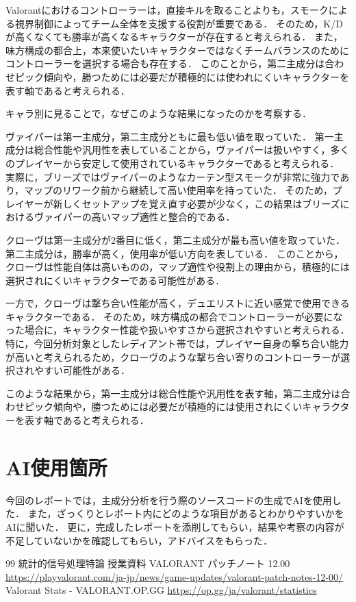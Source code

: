 \documentclass[titlepage,a4paper]{jsarticle}
\begin{document}
Valorantにおけるコントローラーは，直接キルを取ることよりも，スモークによる視界制御によってチーム全体を支援する役割が重要である．
そのため，K/Dが高くなくても勝率が高くなるキャラクターが存在すると考えられる．
また，味方構成の都合上，本来使いたいキャラクターではなくチームバランスのためにコントローラーを選択する場合も存在する．
このことから，第二主成分は合わせピック傾向や，勝つためには必要だが積極的には使われにくいキャラクターを表す軸であると考えられる．

キャラ別に見ることで，なぜこのような結果になったのかを考察する．

ヴァイパーは第一主成分，第二主成分ともに最も低い値を取っていた．
第一主成分は総合性能や汎用性を表していることから，ヴァイパーは扱いやすく，多くのプレイヤーから安定して使用されているキャラクターであると考えられる．
実際に，ブリーズではヴァイパーのようなカーテン型スモークが非常に強力であり，マップのリワーク前から継続して高い使用率を持っていた．
そのため，プレイヤーが新しくセットアップを覚え直す必要が少なく，この結果はブリーズにおけるヴァイパーの高いマップ適性と整合的である．

クローヴは第一主成分が2番目に低く，第二主成分が最も高い値を取っていた．
第二主成分は，勝率が高く，使用率が低い方向を表している．
このことから，クローヴは性能自体は高いものの，マップ適性や役割上の理由から，積極的には選択されにくいキャラクターである可能性がある．

一方で，クローヴは撃ち合い性能が高く，デュエリストに近い感覚で使用できるキャラクターである．
そのため，味方構成の都合でコントローラーが必要になった場合に，キャラクター性能や扱いやすさから選択されやすいと考えられる．
特に，今回分析対象としたレディアント帯では，プレイヤー自身の撃ち合い能力が高いと考えられるため，クローヴのような撃ち合い寄りのコントローラーが選択されやすい可能性がある．

このような結果から，第一主成分は総合性能や汎用性を表す軸，第二主成分は合わせピック傾向や，勝つためには必要だが積極的には使用されにくいキャラクターを表す軸であると考えられる．

\section{AI使用箇所}
  今回のレポートでは，主成分分析を行う際のソースコードの生成でAIを使用した．
  また，ざっくりとレポート内にどのような項目があるとわかりやすいかをAIに聞いた．
  更に，完成したレポートを添削してもらい，結果や考察の内容が不足していないかを確認してもらい，アドバイスをもらった．
\begin{thebibliography}{99}
 統計的信号処理特論 授業資料
 VALORANT パッチノート 12.00\\
\url{https://playvalorant.com/ja-jp/news/game-updates/valorant-patch-notes-12-00/}
 Valorant Stats - VALORANT.OP.GG \url{https://op.gg/ja/valorant/statistics}
\end{thebibliography}
\end{document}
